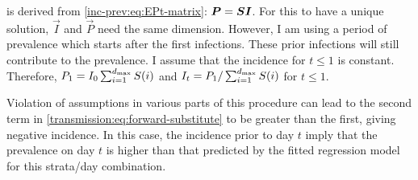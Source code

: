 \documentclass[thesis.tex]{subfiles}
\begin{document}
 is derived from \cref{inc-prev:eq:EPt-matrix}: $\bm{P} = \bm{S} \bm{I}$.
For this to have a unique solution, $\vec{I}$ and $\vec{P}$ need the same dimension.
However, I am using a period of prevalence which starts after the first infections.
These prior infections will still contribute to the prevalence.
I assume that the incidence for $t \leq 1$ is constant.
Therefore, $P_1 = I_0 \sum_{i=1}^{d_\text{max}} S(i)$ and $I_t = P_1 / \sum_{i=1}^{d_\text{max}} S(i)$ for $t \leq 1$.


Violation of assumptions in various parts of this procedure can lead to the second term in \cref{transmission:eq:forward-substitute} to be greater than the first, giving negative incidence.
In this case, the incidence prior to day $t$ imply that the prevalence on day $t$ is higher than that predicted by the fitted regression model for this strata/day combination.
\end{document}
